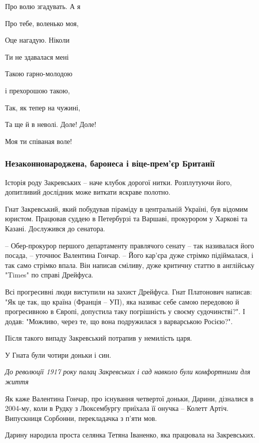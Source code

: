 \begin{multicols}{2}
	\obeycr
	\restorecr
Про волю згадувать. А я

Про тебе, воленько моя,

Оце нагадую. Ніколи

Ти не здавалася мені

Такою гарно-молодою

і прехорошою такою,

Так, як тепер на чужині,

Та ще й в неволі. Доле! Доле!

Моя ти співаная воле!
\end{multicols}

\subsubsection{Незаконнонароджена, баронеса і віце-прем'єр Британії}

Історія роду Закревських – наче клубок дорогої нитки. Розплутуючи його,
допитливий дослідник може виткати яскраве полотно.

Гнат Закревський, який побудував піраміду в центральній Україні, був відомим
юристом. Працював суддею в Петербурзі  та Варшаві, прокурором у Харкові та
Казані. Дослужився до сенатора.

– Обер-прокурор першого департаменту правлячого сенату – так називалася його
посада, – уточнює Валентина Гончар. – Його кар'єра дуже стрімко підіймалася, і
так само стрімко впала. Він написав сміливу, дуже критичну статтю в англійську
"Times" по справі Дрейфуса. 

Всі прогресивні люди виступили на захист Дрейфуса. Гнат Платонович написав: "Як
це так, що країна (Франція – УП), яка називає себе самою передовою й
прогресивною в Європі, допустила таку погрішність у своєму судочинстві?". І
додав: "Можливо, через те, що вона подружилася з варварською Росією?".

Після такого випаду Закревський потрапив у немилість царя.

У Гната були чотири доньки і син. 

\emph{До революції 1917 року палац Закревських і сад навколо були комфортними для життя}

Як каже Валентина Гончар, про існування четвертої доньки, Дарини, дізналися в
2004-му, коли в Рудку з Люксембургу приїхала її онучка – Колетт Артіч.
Випускниця Сорбонни, перекладачка з п'яти мов.

Дарину народила проста селянка Тетяна Іваненко, яка працювала на Закревських.

